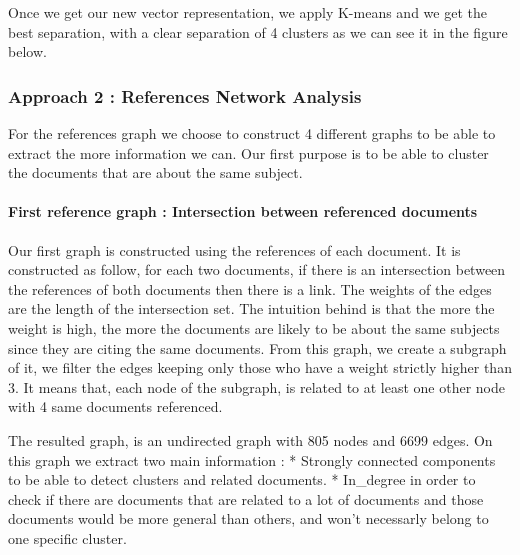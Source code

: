 \documentclass[journal,twocolumn]{IEEEtran}
\begin{document}
Once we get our new vector representation, we apply K-means and we get
the best separation, with a clear separation of 4 clusters as we can see
it in the figure below.


    \begin{figure}
        \begin{center}\end{center}
        \caption{}
        \label{}
    \end{figure}
    
    \hypertarget{approach-2-references-network-analysis}{%
\subsubsection{Approach 2 : References Network
Analysis}\label{approach-2-references-network-analysis}}

For the references graph we choose to construct 4 different graphs to be
able to extract the more information we can. Our first purpose is to be
able to cluster the documents that are about the same subject.

    \hypertarget{first-reference-graph-intersection-between-referenced-documents}{%
\paragraph{First reference graph : Intersection between referenced
documents}\label{first-reference-graph-intersection-between-referenced-documents}}

Our first graph is constructed using the references of each document. It
is constructed as follow, for each two documents, if there is an
intersection between the references of both documents then there is a
link. The weights of the edges are the length of the intersection set.
The intuition behind is that the more the weight is high, the more the
documents are likely to be about the same subjects since they are citing
the same documents. From this graph, we create a subgraph of it, we
filter the edges keeping only those who have a weight strictly higher
than 3. It means that, each node of the subgraph, is related to at least
one other node with 4 same documents referenced.



    The resulted graph, is an undirected graph with 805 nodes and 6699
edges. On this graph we extract two main information : * Strongly
connected components to be able to detect clusters and related
documents. * In\_degree in order to check if there are documents that
are related to a lot of documents and those documents would be more
general than others, and won't necessarly belong to one specific
cluster.
\end{document}
